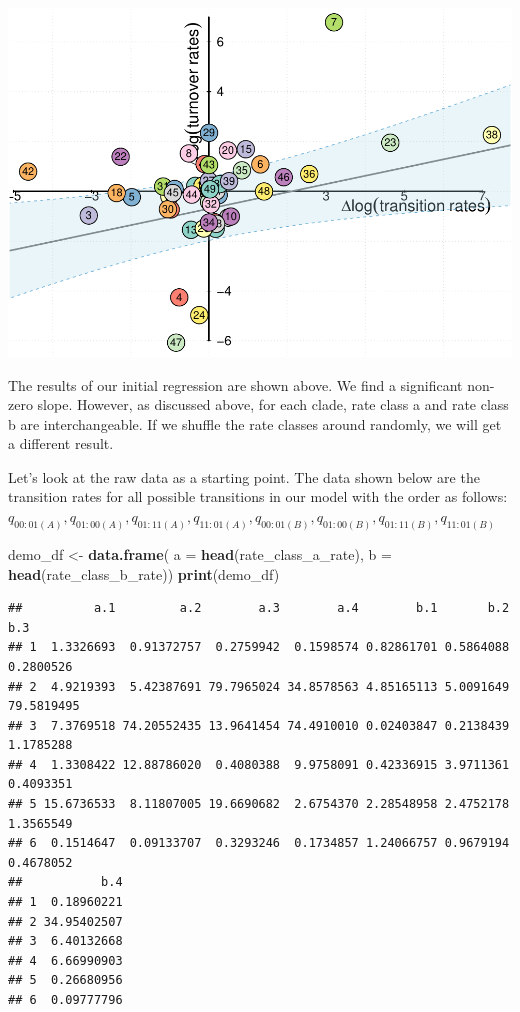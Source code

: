 \documentclass[
]{article}
\newenvironment{Shaded}{\begin{snugshade}}{\end{snugshade}}
\newcommand{\AttributeTok}[1]{\textcolor[rgb]{0.13,0.29,0.53}{#1}}
\newcommand{\FunctionTok}[1]{\textcolor[rgb]{0.13,0.29,0.53}{\textbf{#1}}}
\newcommand{\NormalTok}[1]{#1}
\newcommand{\OtherTok}[1]{\textcolor[rgb]{0.56,0.35,0.01}{#1}}
\begin{document}
\includegraphics{SX-regression-distribution_files/figure-latex/unnamed-chunk-2-1.pdf}

The results of our initial regression are shown above. We find a
significant non-zero slope. However, as discussed above, for each clade,
rate class a and rate class b are interchangeable. If we shuffle the
rate classes around randomly, we will get a different result.

Let's look at the raw data as a starting point. The data shown below are
the transition rates for all possible transitions in our model with the
order as follows:
\(q_{00:01(A)},q_{01:00(A)},q_{01:11(A)},q_{11:01(A)},q_{00:01(B)},q_{01:00(B)},q_{01:11(B)},q_{11:01(B)}\)

\begin{Shaded}
\begin{Highlighting}[]
\NormalTok{demo\_df }\OtherTok{\textless{}{-}} \FunctionTok{data.frame}\NormalTok{( }\AttributeTok{a =} \FunctionTok{head}\NormalTok{(rate\_class\_a\_rate),}
                       \AttributeTok{b =} \FunctionTok{head}\NormalTok{(rate\_class\_b\_rate))}
\FunctionTok{print}\NormalTok{(demo\_df)}
\end{Highlighting}
\end{Shaded}

\begin{verbatim}
##          a.1         a.2        a.3        a.4        b.1       b.2        b.3
## 1  1.3326693  0.91372757  0.2759942  0.1598574 0.82861701 0.5864088  0.2800526
## 2  4.9219393  5.42387691 79.7965024 34.8578563 4.85165113 5.0091649 79.5819495
## 3  7.3769518 74.20552435 13.9641454 74.4910010 0.02403847 0.2138439  1.1785288
## 4  1.3308422 12.88786020  0.4080388  9.9758091 0.42336915 3.9711361  0.4093351
## 5 15.6736533  8.11807005 19.6690682  2.6754370 2.28548958 2.4752178  1.3565549
## 6  0.1514647  0.09133707  0.3293246  0.1734857 1.24066757 0.9679194  0.4678052
##           b.4
## 1  0.18960221
## 2 34.95402507
## 3  6.40132668
## 4  6.66990903
## 5  0.26680956
## 6  0.09777796
\end{verbatim}
\end{document}
